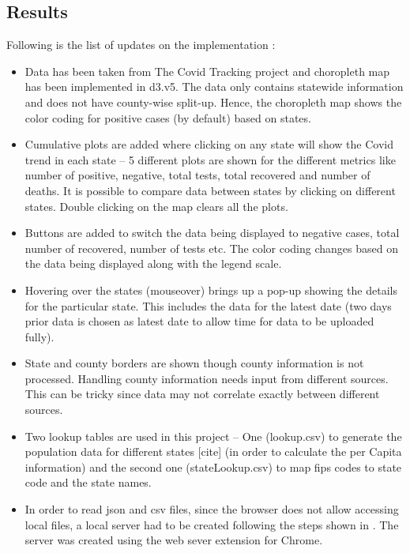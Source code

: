 \subsection{Results}
\label{sec:Prelim}
Following is the list of updates on the implementation :
\begin{itemize}
\item Data has been taken from The Covid Tracking project and choropleth map has been implemented in d3.v5. The data only contains statewide information and does not have county-wise split-up. Hence, the choropleth map shows the color coding for positive cases (by default) based on states.
\item Cumulative plots are added where clicking on any state will show the Covid trend in each state – 5 different plots are shown for the different metrics like number of positive, negative, total tests, total recovered and number of deaths. It is possible to compare data between states by clicking on different states. Double clicking on the map clears all the plots.
\item Buttons are added to switch the data being displayed to negative cases, total number of recovered, number of tests etc. The color coding changes based on the data being displayed along with the legend scale.
\item Hovering over the states (mouseover) brings up a pop-up showing the details for the particular state. This includes the data for the latest date (two days prior data is chosen as latest date to allow time for data to be uploaded fully).
\item State and county borders are shown though county information is not processed. Handling county information needs input from different sources. This can be tricky since data may not correlate exactly between different sources.
\item Two lookup tables are used in this project – One (lookup.csv) to generate the population data for different states [cite] (in order to calculate the per Capita information) and the second one (stateLookup.csv) to map fips codes to state code and the state names.
\item In order to read json and csv files, since the browser does not allow accessing local files, a local server had to be created following the steps shown in \cite{server}. The server was created using the web sever extension for Chrome. 
\end{itemize}

